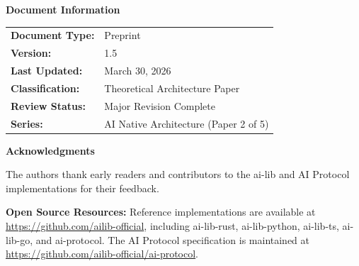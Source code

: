 
\vspace{1cm}
\noindent\textbf{Document Information}

\begin{tabular}{ll}
\textbf{Document Type:} & Preprint \\
\textbf{Version:} & 1.5 \\
\textbf{Last Updated:} & March 30, 2026 \\
\textbf{Classification:} & Theoretical Architecture Paper \\
\textbf{Review Status:} & Major Revision Complete \\
\textbf{Series:} & AI Native Architecture (Paper 2 of 5) \\
\end{tabular}

\vspace{1cm}
\noindent\textbf{Acknowledgments}

The authors thank early readers and contributors to the ai-lib and AI Protocol implementations for their feedback.

\vspace{0.5cm}
\noindent\textbf{Open Source Resources:} Reference implementations are available at \url{https://github.com/ailib-official}, including ai-lib-rust, ai-lib-python, ai-lib-ts, ai-lib-go, and ai-protocol. The AI Protocol specification is maintained at \url{https://github.com/ailib-official/ai-protocol}.
